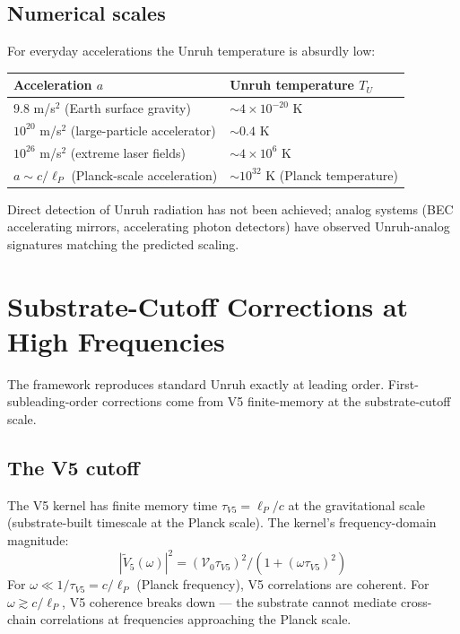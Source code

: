 \documentclass[11pt,a4paper]{article}
\begin{document}
\subsection{Numerical scales}

For everyday accelerations the Unruh temperature is absurdly low:

\begin{center}
\begin{tabular}{ll}
\toprule
\textbf{Acceleration $a$} & \textbf{Unruh temperature $T_U$} \\
\midrule
$9.8$ m/s$^2$ (Earth surface gravity) & $\sim 4 \times 10^{-20}$ K \\
$10^{20}$ m/s$^2$ (large-particle accelerator) & $\sim 0.4$ K \\
$10^{26}$ m/s$^2$ (extreme laser fields) & $\sim 4 \times 10^{6}$ K \\
$a \sim c/\ell_P$ (Planck-scale acceleration) & $\sim 10^{32}$ K (Planck temperature) \\
\bottomrule
\end{tabular}
\end{center}

Direct detection of Unruh radiation has not been achieved; analog systems (BEC accelerating mirrors, accelerating photon detectors) have observed Unruh-analog signatures matching the predicted scaling.

\section{Substrate-Cutoff Corrections at High Frequencies}

The framework reproduces standard Unruh exactly at leading order. First-subleading-order corrections come from V5 finite-memory at the substrate-cutoff scale.

\subsection{The V5 cutoff}

The V5 kernel has finite memory time $\tau_{V5} = \ell_P/c$ at the gravitational scale (substrate-built timescale at the Planck scale). The kernel's frequency-domain magnitude:
\[
|\tilde V_5(\omega)|^{2} = (\mathcal{V}_0 \tau_{V5})^{2} / (1 + (\omega \tau_{V5})^{2})
\]
For $\omega \ll 1/\tau_{V5} = c/\ell_P$ (Planck frequency), V5 correlations are coherent. For $\omega \gtrsim c/\ell_P$, V5 coherence breaks down --- the substrate cannot mediate cross-chain correlations at frequencies approaching the Planck scale.
\end{document}
